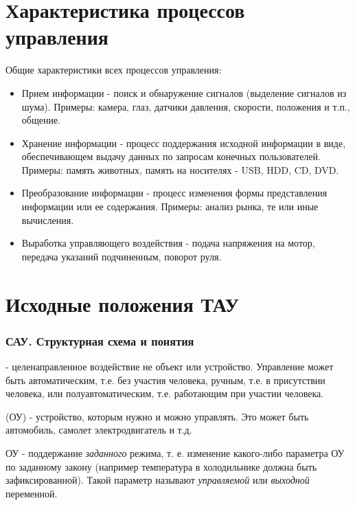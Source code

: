 \documentclass[TAU.tex]{subfiles}
\begin{document}
\section{Характеристика процессов управления}

Общие характеристики всех процессов управления:
\begin{itemize}
  \item Прием информации - поиск и обнаружение сигналов (выделение сигналов из шума). Примеры: камера, глаз, датчики давления, скорости, положения и т.п., общение.
  \item Хранение информации - процесс поддержания исходной информации в виде, обеспечивающем выдачу данных по запросам конечных пользователей. Примеры: память животных, память на носителях - USB, HDD, CD, DVD.
  \item Преобразование информации - процесс изменения формы представления информации или ее содержания. Примеры: анализ рынка, те или иные вычисления.
  \item Выработка управляющего воздействия - подача напряжения на мотор, передача указаний подчиненным, поворот руля. %
\end{itemize}

\section{Исходные положения ТАУ}
\subsubsection{САУ. Структурная схема и понятия}

 - целенаправленное воздействие не объект или устройство. Управление может быть автоматическим, т.е. без участия человека, ручным, т.е. в присутствии человека, или полуавтоматическим, т.е. работающим при участии человека.

 (ОУ) - устройство, которым нужно и можно управлять. Это может быть автомобиль, самолет электродвигатель и т.д.

 ОУ - поддержание 
\textit{заданного} 
режима, т. е. изменение какого-либо параметра ОУ по заданному закону (например температура в холодильнике должна быть зафиксированной). Такой параметр называют 
\textit{управляемой} или 
\textit{выходной} переменной. 
\end{document}
